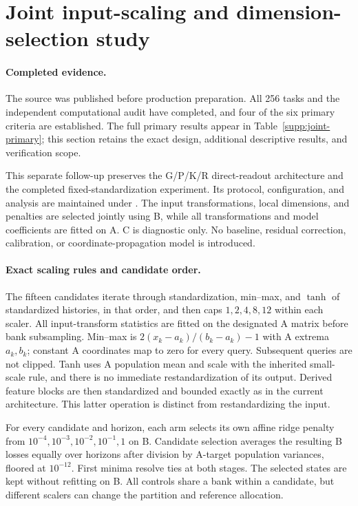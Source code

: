 \section{Joint input-scaling and dimension-selection study}
\label{supp:joint-selection}

\paragraph{Completed evidence.}
The source was published before production preparation. All 256 tasks
and the independent computational audit have completed, and four
of the six primary criteria are established. The full primary
results appear in Table~\ref{supp:joint-primary}; this section retains
the exact design, additional descriptive results, and verification
scope.

This separate follow-up preserves the G/P/K/R direct-readout
architecture and the completed fixed-standardization experiment.
Its protocol, configuration, and analysis are maintained under
.
The input transformations, local dimensions, and penalties are
selected jointly using B, while all transformations and model
coefficients are fitted on A. C is diagnostic only. No baseline,
residual correction, calibration, or coordinate-propagation model
is introduced.

\paragraph{Exact scaling rules and candidate order.}
The fifteen candidates iterate through standardization, min--max,
and $\tanh$ of standardized histories, in that order, and then caps
$1,2,4,8,12$ within each scaler. All input-transform statistics are
fitted on the designated A matrix before bank subsampling.
Min--max is $2(x_k-a_k)/(b_k-a_k)-1$ with A extrema $a_k,b_k$;
constant A coordinates map to zero for every query. Subsequent
queries are not clipped. Tanh uses A population mean and scale with
the inherited small-scale rule, and there is no immediate
restandardization of its output. Derived feature blocks are then
standardized and bounded exactly as in the current architecture.
This latter operation is distinct from restandardizing the input.

For every candidate and horizon, each arm selects its own affine
ridge penalty from $10^{-4},10^{-3},10^{-2},10^{-1},1$ on B.
Candidate selection averages the resulting B losses equally over
horizons after division by A-target population variances, floored
at $10^{-12}$. First minima resolve ties at both stages. The selected
states are kept without refitting on B. All controls share a bank
within a candidate, but different scalers can change the partition
and reference allocation.

